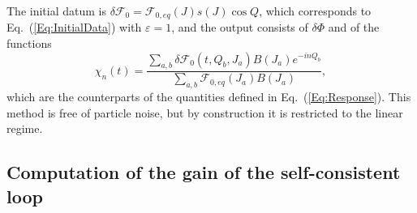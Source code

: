 The initial datum is $\delta\mathcal{F}_0 = \mathcal{F}_{0,eq}(J) s(J)\cos Q$, which corresponds to Eq.~(\ref{Eq:InitialData}) with $\varepsilon = 1$, and the output consists of $\delta\Phi$ and of the functions
\begin{equation}
\chi_n(t) = \frac{\sum_{a,b} \delta\mathcal{F}_0(t,Q_b,J_a) B(J_a) e^{-inQ_b}}{\sum_{a,b} \mathcal{F}_{0,eq}(J_a) B(J_a)},
\label{Eq:ChiLin}
\end{equation}
which are the counterparts of the quantities defined in Eq.~(\ref{Eq:Response}). This method is free of particle noise, but by construction it is restricted to the linear regime.


\subsection{Computation of the gain of the self-consistent loop}
\label{SubSec:GainNum}

